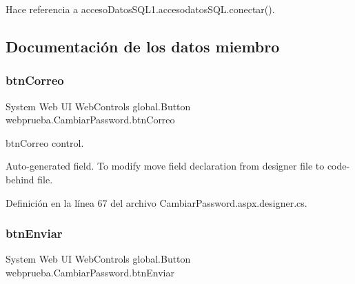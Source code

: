 \begin{DoxyCode}{0}

\end{DoxyCode}


Hace referencia a acceso\+Datos\+S\+Q\+L1.\+accesodatos\+S\+Q\+L.\+conectar().



\subsection{Documentación de los datos miembro}
\mbox{\label{classwebprueba_1_1_cambiar_password_ad380120feab352ba019127db43acd6bf}} 
\subsubsection{\texorpdfstring{btnCorreo}{btnCorreo}}
{\footnotesize\ttfamily System Web UI Web\+Controls global.\+Button webprueba.\+Cambiar\+Password.\+btn\+Correo\hspace{0.3cm}{\ttfamily [protected]}}



btn\+Correo control. 

Auto-\/generated field. To modify move field declaration from designer file to code-\/behind file. 

Definición en la línea 67 del archivo Cambiar\+Password.\+aspx.\+designer.\+cs.

\mbox{\label{classwebprueba_1_1_cambiar_password_a411bf0459849ba353bc2434a4b50bd89}} 
\subsubsection{\texorpdfstring{btnEnviar}{btnEnviar}}
{\footnotesize\ttfamily System Web UI Web\+Controls global.\+Button webprueba.\+Cambiar\+Password.\+btn\+Enviar\hspace{0.3cm}{\ttfamily [protected]}}



